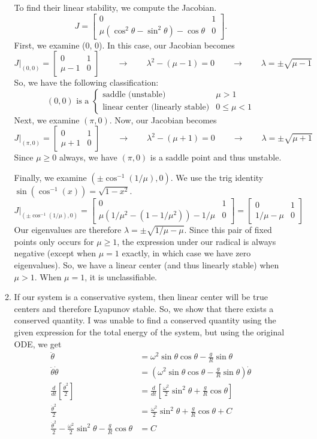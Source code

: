 \documentclass[10pt,letterpaper]{report}
\newcommand{\mtx}[2]{\left[\begin{array}{#1}#2\end{array}\right]}
\begin{document}
\begin{enumerate}
\begin{enumerate}
    To find their linear stability, we compute the Jacobian.
    \[
    J = \mtx{cc}{0 & 1 \\ \mu\left(\cos^2\theta -\sin^2\theta\right) - \cos\theta & 0}.
    \]
    First, we examine (0, 0). In this case, our Jacobian becomes
    \[
    J\big\vert_{(0, 0)} = \mtx{cc}{0 & 1 \\ \mu - 1 & 0} \qquad \rightarrow \qquad \lambda^2 - (\mu - 1) = 0 \qquad \rightarrow \qquad \lambda = \pm \sqrt{\mu - 1}
    \]
    So, we have the following classification:
    \[
    (0, 0) \textrm{ is a } \begin{cases}
    \textrm{saddle (unstable)} &\mu > 1 \\
    \textrm{linear center (linearly stable)} &0 \leq \mu < 1
    \end{cases}
    \]
    Next, we examine $(\pi, 0)$. Now, our Jacobian becomes
    \[
    J\big\vert_{(\pi, 0)} = \mtx{cc}{0 & 1 \\ \mu + 1 & 0} \qquad \rightarrow \qquad \lambda^2 - (\mu + 1) = 0 \qquad \rightarrow \qquad \lambda = \pm \sqrt{\mu + 1}
    \]
    Since $\mu \geq 0$ always, we have $(\pi, 0)$ is a saddle point and thus unstable.
    
    Finally, we examine $(\pm \cos^{-1}(1/\mu), 0)$. We use the trig identity $\sin(\cos^{-1}(x)) = \sqrt{1 - x^2}$.
    \[
    J\big\vert_{(\pm \cos^{-1}(1/\mu), 0)} = \mtx{cc}{0 & 1 \\ \mu\left(1/\mu^2 - (1 - 1/\mu^2)\right) - 1/\mu & 0} = \mtx{cc}{0 & 1 \\ 1/\mu - \mu & 0} 
    \]
    Our eigenvalues are therefore $\lambda = \pm \sqrt{1/\mu - \mu}$. Since this pair of fixed points only occurs for $\mu \geq 1$, the expression under our radical is always negative (except when $\mu = 1$ exactly, in which case we have zero eigenvalues). So, we have a linear center (and thus linearly stable) when $\mu > 1$. When $\mu = 1$, it is unclassifiable. 
    
    \item If our system is a conservative system, then linear center will be true centers and therefore Lyapunov stable. So, we show that there exists a conserved quantity. I was unable to find a conserved quantity using the given expression for the total energy of the system, but using the original ODE, we get
    \begin{align*}
        \ddot \theta &= \omega^2 \sin\theta\cos\theta - \frac{g}{R}\sin\theta \\
        \ddot \theta \dot\theta &= \left(\omega^2 \sin\theta\cos\theta - \frac{g}{R}\sin\theta\right)\dot\theta
        \\
        \frac{d}{dt}\left[\frac{\dot\theta^2}{2}\right] 
        &=
        \frac{d}{dt}\left[\frac{\omega^2}{2}\sin^2\theta + \frac{g}{R}\cos\theta\right]
        \\
        \frac{\dot\theta^2}{2}
        &=
        \frac{\omega^2}{2}\sin^2\theta + \frac{g}{R}\cos\theta + C
        \\
        \frac{\dot\theta^2}{2} - \frac{\omega^2}{2}\sin^2\theta - \frac{g}{R}\cos\theta
        &=
        C
    \end{align*}
    

\end{enumerate}
\end{enumerate}
\end{document}
